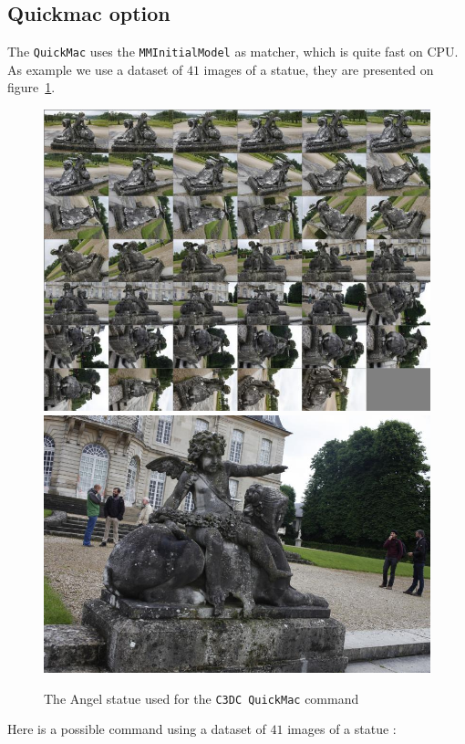 \subsection{Quickmac option}

The {\tt QuickMac} uses the {\tt MMInitialModel} as matcher, which is quite fast on CPU.
As example we use a dataset of $41$ images of a statue, they are presented on figure~\ref{FIG:Angel:Flog}.


\begin{figure}[H]
\begin{center}
\includegraphics[width=120mm]{FIGS/Ange/Panel.jpg}
\includegraphics[width=120mm]{FIGS/Ange/SMALL_MG_1044.JPG}
\end{center}
\caption{The Angel statue used for the {\tt C3DC QuickMac} command}
\label{FIG:Angel:Flog}
\end{figure}


Here is a possible command using a dataset of $41$ images of a statue :


